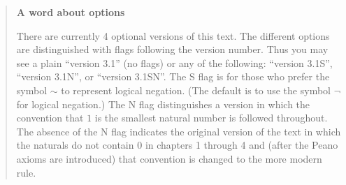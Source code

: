 \documentclass[dvips,12pt,twoside]{book}
\let\savedlnot\lnot
\begin{document}
\vfill


\begin{quote}
{\Large \bf A word about options} 

There are currently 4 optional versions of this text.  The different options are distinguished with
flags following the version number.  Thus you may see a plain ``version  3.1'' (no flags) 
or any of the following: ``version 3.1S'', ``version 3.1N'',  or ``version 3.1SN''. 
The S flag is for those who prefer the symbol $\sim$ to represent 
logical negation.  (The default is to
use the symbol $\savedlnot$ for logical negation.)  The N flag distinguishes a version in which
the convention that $1$ is the smallest natural number is followed throughout.  The absence
of the N flag indicates the original version of the text in which the naturals do not contain $0$
in chapters 1 through 4 and (after the Peano axioms are introduced) that convention is changed
to the more modern rule. 

\end{quote}


\vfill
\clearpage

\tableofcontents

\listoffigures

\listoftables




\mainmatter













{}%


%

{}
\printindex
\end{document}
